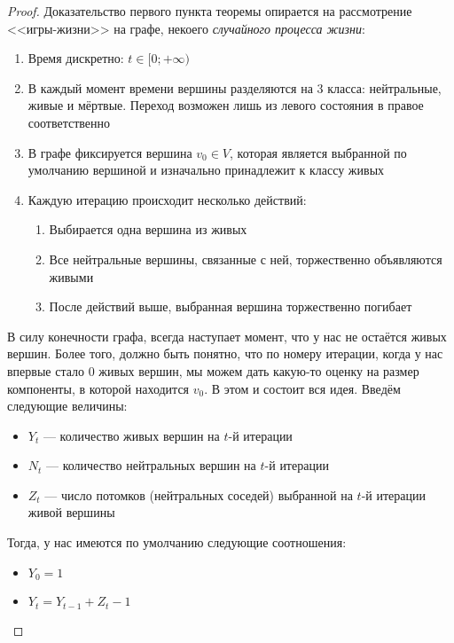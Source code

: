 \begin{proof}
	Доказательство первого пункта теоремы опирается на рассмотрение <<игры-жизни>> на графе, некоего \textit{случайного процесса жизни}:
	\begin{enumerate}
		\item Время дискретно: $t \in [0; +\infty)$
		
		\item В каждый момент времени вершины разделяются на 3 класса: нейтральные, живые и мёртвые. Переход возможен лишь из левого состояния в правое соответственно
		
		\item В графе фиксируется вершина $v_0 \in V$, которая является выбранной по умолчанию вершиной и изначально принадлежит к классу живых
		
		\item Каждую итерацию происходит несколько действий:
		\begin{enumerate}
			\item Выбирается одна вершина из живых
			
			\item Все нейтральные вершины, связанные с ней, торжественно объявляются живыми
			
			\item После действий выше, выбранная вершина торжественно погибает
		\end{enumerate}
	\end{enumerate}
	В силу конечности графа, всегда наступает момент, что у нас не остаётся живых вершин. Более того, должно быть понятно, что по номеру итерации, когда у нас впервые стало 0 живых вершин, мы можем дать какую-то оценку на размер компоненты, в которой находится $v_0$. В этом и состоит вся идея. Введём следующие величины:
	\begin{itemize}
		\item $Y_t$ --- количество живых вершин на $t$-й итерации
		
		\item $N_t$ --- количество нейтральных вершин на $t$-й итерации
		
		\item $Z_t$ --- число потомков (нейтральных соседей) выбранной на $t$-й итерации живой вершины
	\end{itemize}
	Тогда, у нас имеются по умолчанию следующие соотношения:
	\begin{itemize}
		\item $Y_0 = 1$
		
		\item $Y_t = Y_{t - 1} + Z_t - 1$
		

\end{itemize}
\end{proof}
